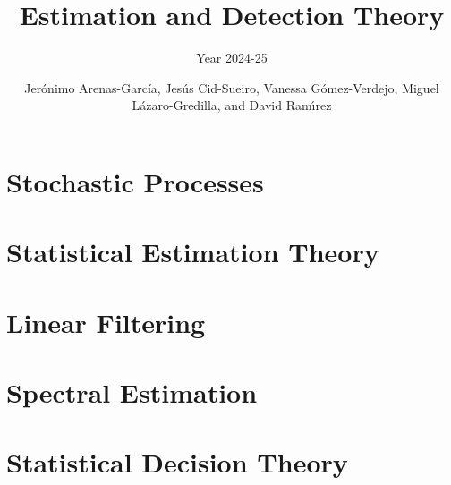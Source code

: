 \documentclass[graybox,envcountchap,sectrefs]{svmono_mod}
\begin{document}
\author{Jer\'onimo Arenas-Garc\'ia, Jes\'us Cid-Sueiro, Vanessa G\'omez-Verdejo, Miguel L\'azaro-Gredilla, and David Ram{\'\i}rez}
\title{Estimation and Detection Theory}
\subtitle{Year 2024-25}
\maketitle

\frontmatter


\chapter{Stochastic Processes}
\chapter{Statistical Estimation Theory}
\chapter{Linear Filtering}
\label{cha:FiltradoLinea}
\chapter{Spectral Estimation}

\chapter{Statistical Decision Theory}
\label{ch:SDT}

\mainmatter
\tableofcontents
%
\mainmatter%


%

%

% 
%

% 

\backmatter%
%
%
\printindex
\end{document}
